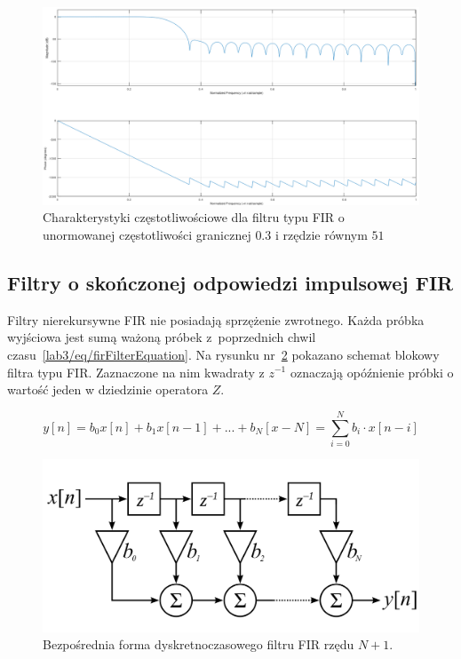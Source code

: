 \begin{figure}[hbt!]
	\centering
	\includegraphics[width=0.9\linewidth]{images/freqzFunction.png}
	\caption{Charakterystyki częstotliwościowe dla filtru typu FIR o unormowanej częstotliwości granicznej $0.3$ i rzędzie równym $51$}
	\label{lab3/fig/freqzFunction}
\end{figure}

\subsection{Filtry o skończonej odpowiedzi impulsowej FIR}
Filtry nierekursywne FIR nie posiadają sprzężenie zwrotnego. Każda próbka wyjściowa jest sumą ważoną próbek z~poprzednich chwil czasu~\ref{lab3/eq/firFilterEquation}. Na rysunku nr~\ref{lab3/fig/firFilterDirectForm} pokazano schemat blokowy filtra typu FIR. Zaznaczone na nim kwadraty z $z^{-1}$ oznaczają opóźnienie próbki o wartość jeden w dziedzinie operatora $Z$.

\begin{equation}\label{lab3/eq/firFilterEquation}
	y[n] = b_0 x[n] + b_1 x[n-1] + ... + b_N[x-N] = \sum_{i=0}^{N}b_i\cdot x[n-i]
\end{equation}

\begin{figure}[hbt!]
	\centering
	\includegraphics[width=0.7\linewidth]{images/firFilterDirectForm.png}
	\caption{Bezpośrednia forma dyskretnoczasowego filtru FIR rzędu $N+1$.}
	\label{lab3/fig/firFilterDirectForm}
\end{figure}

